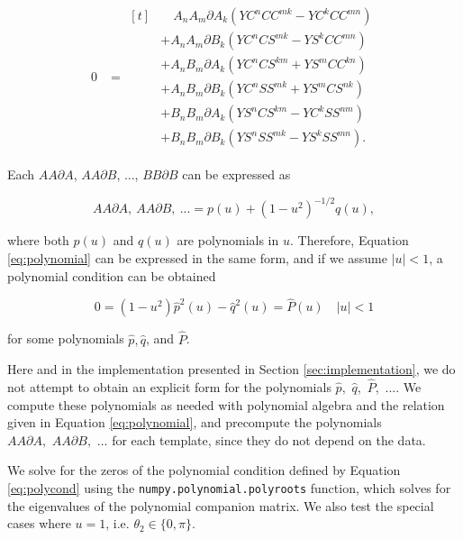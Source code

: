 \documentclass[apj]{emulateapj}
\newcommand{\dA}{\partial A}
\newcommand{\dB}{\partial B}
\begin{document}
\begin{align}\label{eq:polynomial}
0 &= 
\begin{aligned}[t]
&\quad A_nA_m\dA_k\left(YC^nCC^{mk} -  YC^kCC^{mn}\right)\\
&+ A_nA_m\dB_k\left(YC^nCS^{mk} - YS^kCC^{mn}\right)\\
&+ A_nB_m\dA_k\left(YC^nCS^{km} + YS^mCC^{kn}\right)\\
&+ A_nB_m\dB_k\left(YC^nSS^{mk} + YS^mCS^{nk}\right)\\
&+ B_nB_m\dA_k\left(YS^nCS^{km} - YC^kSS^{nm}\right)\\
&+ B_nB_m\dB_k\left(YS^nSS^{mk} - YS^kSS^{mn}\right).
\end{aligned}
\end{align}

Each $AA\dA$, $AA\dB$, ..., $BB\dB$ can be expressed as 

\begin{equation}
AA\dA,~AA\dB,~...= p(u) + (1 - u^2)^{-1/2}q(u),
\end{equation}

\noindent where both $p(u)$ and $q(u)$ are polynomials in $u$. Therefore, Equation
\ref{eq:polynomial} can be expressed in the same form, and if we assume $|u| < 1$,
a polynomial condition can be obtained

\begin{equation}\label{eq:polycond}
0 = (1 - u^2)\hat{p}^2(u) - \hat{q}^2(u) = \hat{P}(u)\quad |u| < 1
\end{equation}

\noindent for some polynomials $\hat{p}, \hat{q}$, and $\hat{P}$.

Here and in the implementation presented in Section \ref{sec:implementation}, we
do not attempt to obtain an explicit form for the polynomials $\hat{p},\,\,\hat{q},\,\,\hat{P},\,\,...$.
We compute these polynomials as needed with polynomial algebra and the relation given 
in Equation \ref{eq:polynomial}, and precompute the polynomials $AA\dA,\,\,AA\dB,\,\,...$ 
for each template, since they do not depend on the data. 

We solve for the zeros of the polynomial condition defined by Equation \ref{eq:polycond}
using the \texttt{numpy.polynomial.polyroots} function, which solves for the eigenvalues 
of the polynomial companion matrix. We also test the special cases where $u=1$, 
i.e. $\theta_2 \in \{ 0, \pi \}$. 
\end{document}
